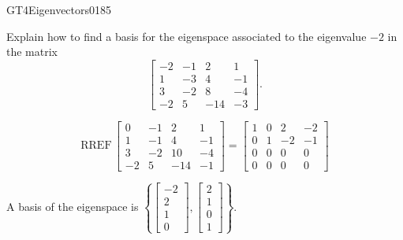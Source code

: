 \begin{exercise}{GT4}{Eigenvectors}{0185} 
\begin{exerciseStatement} 

Explain how to find a basis for the eigenspace associated to the eigenvalue \(-2\) in the matrix \[\left[\begin{array}{cccc}
-2 & -1 & 2 & 1 \\
1 & -3 & 4 & -1 \\
3 & -2 & 8 & -4 \\
-2 & 5 & -14 & -3
\end{array}\right].\]

 \end{exerciseStatement}
 \begin{exerciseAnswer} 

\[\mathrm{RREF}\,\left[\begin{array}{cccc}
0 & -1 & 2 & 1 \\
1 & -1 & 4 & -1 \\
3 & -2 & 10 & -4 \\
-2 & 5 & -14 & -1
\end{array}\right]=\left[\begin{array}{cccc}
1 & 0 & 2 & -2 \\
0 & 1 & -2 & -1 \\
0 & 0 & 0 & 0 \\
0 & 0 & 0 & 0
\end{array}\right]\]

 

A basis of the eigenspace is \(\left\{ \left[\begin{array}{c}
-2 \\
2 \\
1 \\
0
\end{array}\right] , \left[\begin{array}{c}
2 \\
1 \\
0 \\
1
\end{array}\right] \right\}\).

 \end{exerciseAnswer}
 \end{exercise}



